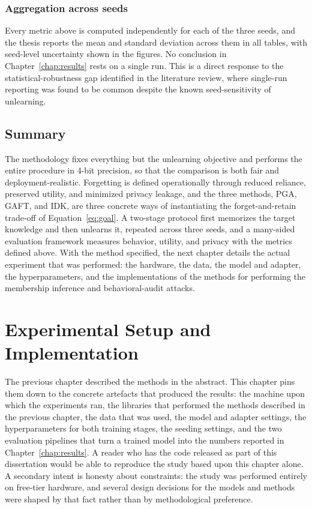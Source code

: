 \documentclass[a4paper,12pt]{report}
\begin{document}
\subsection{Aggregation across seeds}
Every metric above is computed independently for each of the three seeds, and the thesis reports the mean and standard deviation across them in all tables, with seed-level uncertainty shown in the figures. No conclusion in Chapter~\ref{chap:results} rests on a single run. This is a direct response to the statistical-robustness gap identified in the literature review, where single-run reporting was found to be common despite the known seed-sensitivity of unlearning.

\section{Summary}
The methodology fixes everything but the unlearning objective and performs the entire procedure in 4-bit precision, so that the comparison is both fair and deployment-realistic. Forgetting is defined operationally through reduced reliance, preserved utility, and minimized privacy leakage, and the three methods, PGA, GAFT, and IDK, are three concrete ways of instantiating the forget-and-retain trade-off of Equation~\eqref{eq:goal}. A two-stage protocol first memorizes the target knowledge and then unlearns it, repeated across three seeds, and a many-sided evaluation framework measures behavior, utility, and privacy with the metrics defined above. With the method specified, the next chapter details the actual experiment that was performed: the hardware, the data, the model and adapter, the hyperparameters, and the implementations of the methods for performing the membership inference and behavioral-audit attacks.

\chapter{Experimental Setup and Implementation}
\label{chap:setup}

The previous chapter described the methods in the abstract. This chapter pins them down to the concrete artefacts that produced the results: the machine upon which the experiments ran, the libraries that performed the methods described in the previous chapter, the data that was used, the model and adapter settings, the hyperparameters for both training stages, the seeding settings, and the two evaluation pipelines that turn a trained model into the numbers reported in Chapter~\ref{chap:results}. A reader who has the code released as part of this dissertation would be able to reproduce the study based upon this chapter alone. A secondary intent is honesty about constraints: the study was performed entirely on free-tier hardware, and several design decisions for the models and methods were shaped by that fact rather than by methodological preference.
\end{document}
